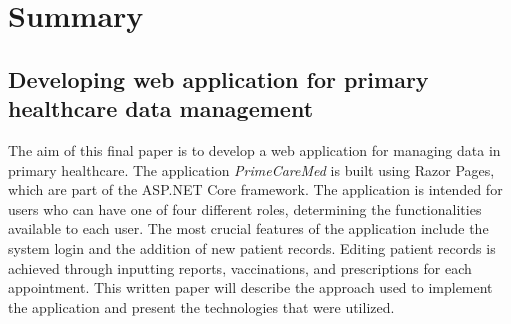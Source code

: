 \section*{Summary}
\subsection*{Developing web application for primary healthcare data management}
The aim of this final paper is to develop a web application for managing data in primary healthcare. The application \textit{PrimeCareMed} is built using Razor Pages, which are part of the ASP.NET Core framework. The application is intended for users who can have one of four different roles, determining the functionalities available to each user. The most crucial features of the application include the system login and the addition of new patient records. Editing patient records is achieved through inputting reports, vaccinations, and prescriptions for each appointment. This written paper will describe the approach used to implement the application and present the technologies that were utilized.
